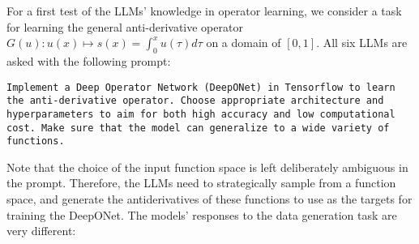 \documentclass{article}
\begin{document}
For a first test of the LLMs' knowledge in operator learning, we consider a task for learning the general anti-derivative operator $G(u): u(x) \mapsto s(x) = \int_0^x u(\tau) d\tau$ on a domain of $[0,1]$. All six LLMs are asked with the following prompt: 

\texttt{Implement a Deep Operator Network (DeepONet) in Tensorflow to learn the anti-derivative operator. Choose appropriate architecture and hyperparameters to aim for both high accuracy and low computational cost. Make sure that the model can generalize to a wide variety of functions. }

Note that the choice of the input function space is left deliberately ambiguous in the prompt. Therefore, the LLMs need to strategically sample from a function space, and generate the antiderivatives of these functions to use as the targets for training the DeepONet. The models' responses to the data generation task are very different:
\end{document}
